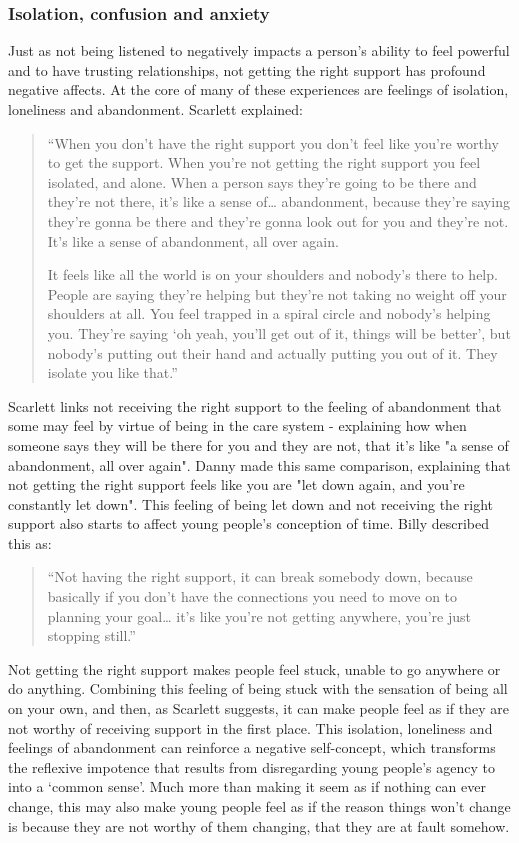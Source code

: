 \subsubsection{Isolation, confusion and anxiety}
Just as not being listened to negatively impacts a person's ability to feel powerful and to have trusting relationships, not getting the right support has profound negative affects. At the core of many of these experiences are feelings of isolation, loneliness and abandonment. Scarlett explained:
\begin{quote}
“When you don’t have the right support you don’t feel like you’re worthy to get the support. When you’re not getting the right support you feel isolated, and alone. When a person says they’re going to be there and they’re not there, it’s like a sense of… abandonment, because they’re saying they’re gonna be there and they’re gonna look out for you and they’re not. It’s like a sense of abandonment, all over again. 

It feels like all the world is on your shoulders and nobody’s there to help. People are saying they’re helping but they’re not taking no weight off your shoulders at all. You feel trapped in a spiral circle and nobody’s helping you. They’re saying ‘oh yeah, you’ll get out of it, things will be better’, but nobody’s putting out their hand and actually putting you out of it. They isolate you like that.”
\end{quote}
Scarlett links not receiving the right support to the feeling of abandonment that some may feel by virtue of being in the care system - explaining how when someone says they will be there for you and they are not, that it's like "a sense of abandonment, all over again". Danny made this same comparison, explaining that not getting the right support feels like you are "let down again, and you're constantly let down". This feeling of being let down and not receiving the right support also starts to affect young people’s conception of time. Billy described this as:
\begin{quote}
“Not having the right support, it can break somebody down, because basically if you don’t have the connections you need to move on to planning your goal… it’s like you’re not getting anywhere, you’re just stopping still.”
\end{quote}
Not getting the right support makes people feel stuck, unable to go anywhere or do anything. Combining this feeling of being stuck with the sensation of being all on your own, and then, as Scarlett suggests, it can make people feel as if they are not worthy of receiving support in the first place. This isolation, loneliness and feelings of abandonment can reinforce a negative self-concept, which transforms the reflexive impotence that results from disregarding young people’s agency to into a ‘common sense’. Much more than making it seem as if nothing can ever change, this may also make young people feel as if the reason things won’t change is because they are not worthy of them changing, that they are at fault somehow. 

